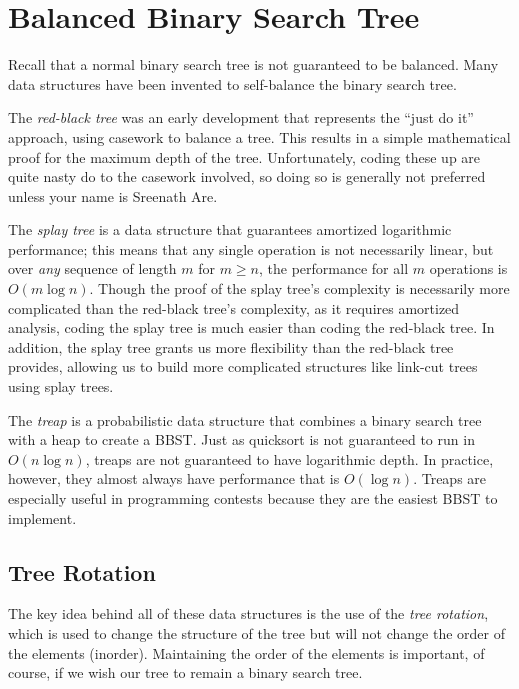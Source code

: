 \section{Balanced Binary Search Tree}

Recall that a normal binary search tree is not guaranteed to be balanced. Many data structures have been invented to self-balance the binary search tree.

The \textit{red-black tree} was an early development that represents the ``just do it'' approach, using casework to balance a tree. This results in a simple mathematical proof for the maximum depth of the tree. Unfortunately, coding these up are quite nasty do to the casework involved, so doing so is generally not preferred unless your name is Sreenath Are.

The \textit{splay tree} is a data structure that guarantees amortized logarithmic performance; this means that any single operation is not necessarily linear, but over \textit{any} sequence of length $m$ for $m \ge n$, the performance for all $m$ operations is $O(m \log{n})$. Though the proof of the splay tree's complexity is necessarily more complicated than the red-black tree's complexity, as it requires amortized analysis, coding the splay tree is much easier than coding the red-black tree. In addition, the splay tree grants us more flexibility than the red-black tree provides, allowing us to build more complicated structures like link-cut trees using splay trees.

The \textit{treap} is a probabilistic data structure that combines a binary search tree with a heap to create a BBST. Just as quicksort is not guaranteed to run in $O(n\log{n})$, treaps are not guaranteed to have logarithmic depth. In practice, however, they almost always have performance that is $O(\log n)$. Treaps are especially useful in programming contests because they are the easiest BBST to implement. 

\subsection{Tree Rotation}

The key idea behind all of these data structures is the use of the \textit{tree rotation}, which is used to change the structure of the tree but will not change the order of the elements (inorder). Maintaining the order of the elements is important, of course, if we wish our tree to remain a binary search tree.

